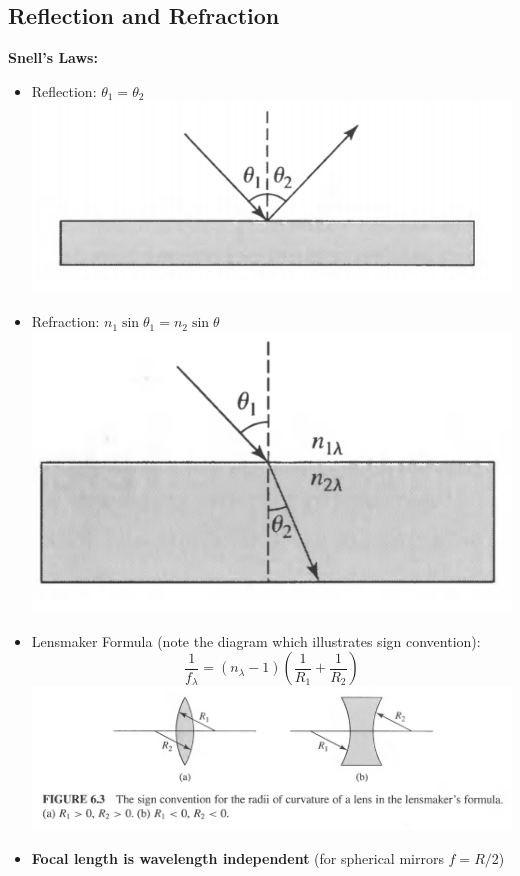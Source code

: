 \documentclass[12pt]{article}
\begin{document}
\subsection{Reflection and Refraction}
\textbf{Snell's Laws:}
\begin{itemize}
    \item Reflection: $\theta_1 = \theta_2$\newline
    \includegraphics[scale=0.5]{Figures/Reflection.png}
    \item Refraction: $n_1\sin\theta_1 = n_2\sin\theta$\newline
    \includegraphics[scale=0.5]{Figures/Refraction.png}

    \item Lensmaker Formula (note the diagram which illustrates sign convention): $$ \frac{1}{f_{\lambda}} = (n_{\lambda} - 1)\left(\frac{1}{R_1} + \frac{1}{R_2}\right) $$
    \includegraphics[scale=0.4]{Figures/LensmakerSignConvention.png}
    \item \textbf{Focal length is wavelength independent} (for spherical mirrors $f = R/2$)

\end{itemize}
\end{document}
